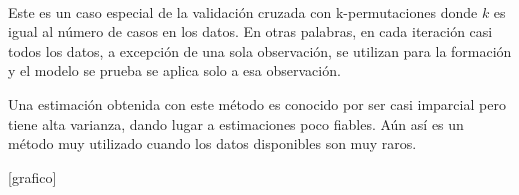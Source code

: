 \begin{description}
      [grafico]
      
      \item[Leave-One-Out Cross-Validation] \hfill \\
     Este es un caso especial de la validación cruzada con k-permutaciones donde $k$ es igual al número de casos en los datos. En otras palabras, en cada iteración casi todos los datos, a excepción de una sola observación, se utilizan para la formación y el modelo se prueba se aplica solo a esa observación. 
     
     Una estimación obtenida con este método es conocido por ser casi imparcial pero tiene alta varianza, dando lugar a estimaciones poco fiables. Aún así es un método muy utilizado cuando los datos disponibles son muy raros.
     
      [grafico]
    \end{description}

